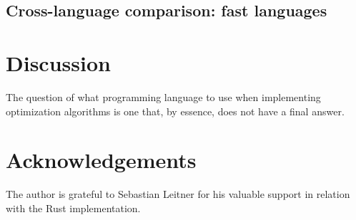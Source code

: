 \documentclass[11pt,a4paper,notitlepage]{article}
\begin{document}
\subsection{Cross-language comparison: fast languages}

\section{Discussion}
The question of what programming language to use when implementing
optimization algorithms is one that, by essence, does not have a final
answer.

\section*{Acknowledgements}
The author is grateful to Sebastian Leitner for his valuable support
in relation with the Rust implementation.



\end{document}
